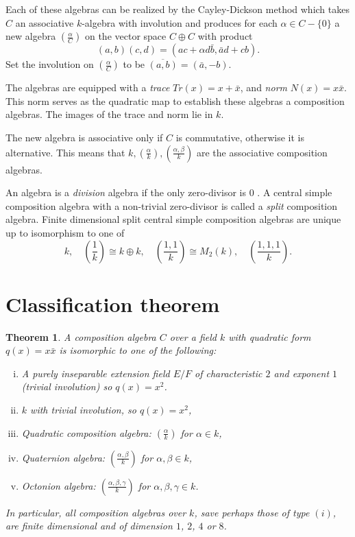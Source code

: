 \documentclass[12pt]{article}
\newtheorem{thm}{Theorem}
\newcommand{\CayDick}[2]{\left(\frac{#1}{#2}\right)}
\begin{document}
Each of these algebras can be realized by the Cayley-Dickson method which takes $C$ 
an associative $k$-algebra with involution and produces for each $\alpha\in C-\{0\}$ a new 
algebra $\CayDick{\alpha}{C}$ on the vector space $C\oplus C$ with product
	\[(a,b)(c,d)=(ac+\alpha d \bar{b},\bar{a}d+cb).\]
Set the involution on $\CayDick{\alpha}{C}$ to be $\overline{(a,b)}=(\bar{a},-b)$.  

The algebras are equipped with a \emph{trace} $Tr(x)=x+\bar{x}$,
and \emph{norm} $N(x)=x\bar{x}$.  This norm serves as the quadratic map to establish
these algebras a composition algebras.  The images of the trace and norm lie in $k$.

The new algebra is associative only if $C$ is commutative, otherwise it is alternative.  
This means that $\displaystyle k, \CayDick{\alpha}{k},\CayDick{\alpha,\beta}{k}$ are 
the associative composition algebras.

An algebra is a \emph{division} algebra if the only zero-divisor is $0$ 
\cite[II.2]{Schafer:nonass}.  A central simple composition algebra with a non-trivial 
zero-divisor is called a \emph{split} composition algebra.  Finite dimensional split 
central simple composition algebras are unique up to isomorphism to one of
\[ k,\quad \CayDick{1}{k}\cong k\oplus k,\quad \CayDick{1,1}{k}\cong M_2(k),
\quad \CayDick{1,1,1}{k}.\]

\section{Classification theorem}

\begin{thm}\label{thm:Hurwitz}\cite[Theorem 6.2.3]{jac}
A composition algebra $C$ over a field $k$ with quadratic form $q(x)=x\bar{x}$ is isomorphic
to one of the following:
\begin{enumerate}[(i)]
\item A purely inseparable extension field $E/F$ of characteristic $2$ and exponent $1$ (trivial
involution) so $q(x)=x^2$.
\item $k$ with trivial involution, so $q(x)=x^2$,
\item Quadratic composition algebra: $\CayDick{\alpha}{k}$ for $\alpha\in k$,
\item Quaternion algebra: $\CayDick{\alpha,\beta}{k}$ for $\alpha,\beta\in k$,
\item Octonion algebra: $\CayDick{\alpha,\beta,\gamma}{k}$ for $\alpha,\beta,\gamma\in k$.
\end{enumerate}
In particular, all composition algebras over $k$, save perhaps those of type $(i)$, are finite 
dimensional and of dimension $1$, $2$, $4$ or $8$.
\end{thm}
\end{document}
